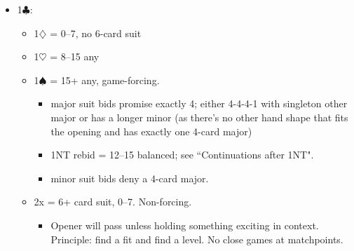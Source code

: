 \documentclass[a4paper,12pt]{article}
\begin{document}
\begin{itemize}
\item 1$\clubsuit$:
	\begin{itemize}
   \item 1$\diamondsuit$ = 0--7, no 6-card suit
   \item 1$\heartsuit$ = 8--15 any
   \item 1$\spadesuit$ = 15+ any, game-forcing.
		\begin{itemize}
      \item major suit bids promise exactly 4; either 4-4-4-1 with singleton other
         major or has a longer minor (as there's no other hand shape that fits the
         opening and has exactly one 4-card major)
      \item 1NT rebid = 12--15 balanced; see ``Continuations after 1NT".
      \item minor suit bids deny a 4-card major.
		\end{itemize}
   \item 2x = 6+ card suit, 0--7. Non-forcing.
		\begin{itemize}
      \item Opener will pass unless holding something exciting in context.
         Principle: find a fit and find a level. No close games at matchpoints.
		\end{itemize}
	\end{itemize}


\end{itemize}
\end{document}
